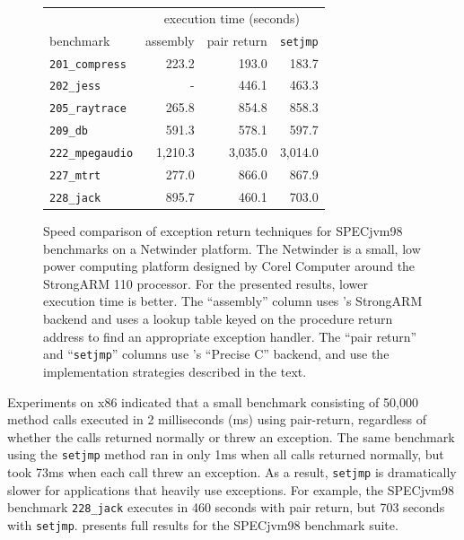 \begin{figure}\sis
\begin{center}
\begin{tabular}{lrrr}
          &\multicolumn{3}{c}{execution time (seconds)} \\
benchmark &\multicolumn{1}{c}{assembly}
          &\multicolumn{1}{c}{pair return}
          &\multicolumn{1}{c}{\texttt{setjmp}} \\ \hline
{\tt 201\_compress} &    223.2 &   193.0 &   183.7 \\
{\tt 202\_jess}     &        - &   446.1 &   463.3 \\
{\tt 205\_raytrace} &    265.8 &   854.8 &   858.3 \\
{\tt 209\_db}       &    591.3 &   578.1 &   597.7 \\
{\tt 222\_mpegaudio}&  1,210.3 & 3,035.0 & 3,014.0 \\
{\tt 227\_mtrt}     &    277.0 &   866.0 &   867.9 \\
{\tt 228\_jack}     &    895.7 &   460.1 &   703.0 \\
\end{tabular}
\end{center}
\caption[Speed comparison of exception return techniques for SPECjvm98
  benchmarks.]
{Speed comparison of exception return techniques for SPECjvm98
  benchmarks on a Netwinder platform.
  The Netwinder is a small, low power computing platform
  designed by Corel Computer around the StrongARM 110 processor.
  For the presented results, lower execution time is better.
  The ``assembly'' column uses \flex's StrongARM backend and uses a lookup
  table keyed on the procedure return address to find an appropriate
  exception handler.  The ``pair return'' and ``\texttt{setjmp}''
  columns use \flex's ``Precise C'' backend, and use the
  implementation strategies described in the text.}
\label{fig:setjmp}
\end{figure}

Experiments on x86 indicated that
a small benchmark consisting of 50,000 method calls executed in
2 milliseconds (ms) using pair-return, regardless of whether the calls
returned normally or threw an exception.  The same benchmark
using the \texttt{setjmp} method ran in only 
1ms when all calls returned normally, but took 73ms when
each call threw an exception. As a result,
\texttt{setjmp} is dramatically slower for applications that heavily use
exceptions.  For example, the SPECjvm98 benchmark \texttt{228\_jack}
executes in 460 seconds with pair return, but 703 seconds with
\texttt{setjmp}.   presents full results for the
SPECjvm98 benchmark suite.

